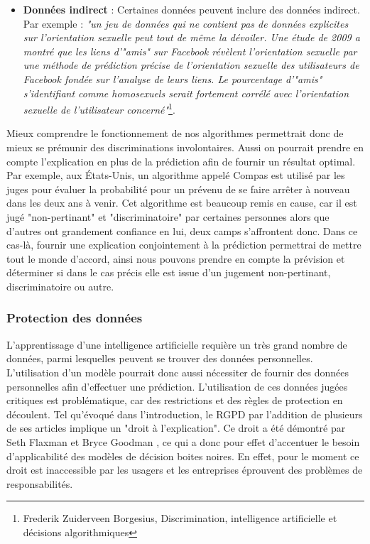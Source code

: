 \begin{itemize}
    \item \textbf{Données indirect} : Certaines données peuvent inclure des données indirect. Par exemple : \textit{"un jeu de données qui ne contient pas de données explicites sur l’orientation sexuelle peut tout de même la dévoiler. Une étude de 2009 a montré que les liens d’"amis" sur Facebook révèlent l’orientation sexuelle par une méthode de prédiction précise de l’orientation sexuelle des utilisateurs de Facebook fondée sur l’analyse de leurs liens. Le pourcentage d’"amis" s’identifiant comme homosexuels serait fortement corrélé avec l’orientation sexuelle de l’utilisateur concerné"}\footnote{Frederik Zuiderveen Borgesius, Discrimination, intelligence artificielle et décisions algorithmiques}. 
\end{itemize}
Mieux comprendre le fonctionnement de nos algorithmes permettrait donc de mieux se prémunir des discriminations involontaires. Aussi on pourrait prendre en compte l'explication en plus de la prédiction afin de fournir un résultat optimal. Par exemple, aux États-Unis, un algorithme appelé Compas est utilisé par les juges pour évaluer la probabilité pour un prévenu de se faire arrêter à nouveau dans les deux ans à venir. Cet algorithme est beaucoup remis en cause, car il est jugé "non-pertinant" et "discriminatoire" par certaines personnes alors que d'autres ont grandement confiance en lui, deux camps s'affrontent donc. Dans ce cas-là, fournir une explication conjointement à la prédiction permettrai de mettre tout le monde d'accord, ainsi nous pouvons prendre en compte la prévision et déterminer si dans le cas précis elle est issue d'un jugement non-pertinant, discriminatoire ou autre.
\subsubsection{Protection des données}
L'apprentissage d'une intelligence artificielle requière un très grand nombre de données, parmi lesquelles peuvent se trouver des données personnelles. L'utilisation d'un modèle pourrait donc aussi nécessiter de fournir des données personnelles afin d'effectuer une prédiction. L'utilisation de ces données jugées critiques est problématique, car des restrictions et des règles de protection en découlent. Tel qu'évoqué dans l'introduction, le RGPD par l'addition de plusieurs de ses articles implique un "droit à l'explication". Ce droit a été démontré par Seth Flaxman et Bryce Goodman \cite{RGPDexplanRight}, ce qui a donc pour effet d'accentuer le besoin d'applicabilité des modèles de décision boites noires. En effet, pour le moment ce droit est inaccessible par les usagers et les entreprises éprouvent des problèmes de responsabilités.

